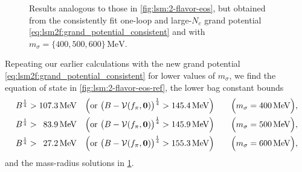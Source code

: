 \begin{figure}[t]
\caption{\label{fig:lsm:2-flavor-mass-radius-ref}%
Results analogous to those in \cref{fig:lsm:2-flavor-eos}, but obtained from the consistently fit one-loop and large-$N_c$ grand potential \eqref{eq:lsm2f:grand_potential_consistent}
and with $m_\sigma = \{400,500,600\} \, \si{\mega\electronvolt}$.
}
\end{figure}

Repeating our earlier calculations with the new grand potential \eqref{eq:lsm2f:grand_potential_consistent} for lower values of $m_\sigma$,
we find the equation of state in \cref{fig:lsm:2-flavor-eos-ref},
the lower bag constant bounds
\begin{subequations}
\begin{align}
	B^\frac14 > \SI{107.3}{\mega\electronvolt}           \quad \Big(\text{or } \big(B-\mathcal{V}(f_\pi,{\bm{0}})\big)^\frac14 > \SI{145.4}{\mega\electronvolt}\Big) \qquad \Big(m_\sigma = \SI{400}{\mega\electronvolt}\Big), \\
	B^\frac14 > \phantom{0}\SI{83.9}{\mega\electronvolt} \quad \Big(\text{or } \big(B-\mathcal{V}(f_\pi,{\bm{0}})\big)^\frac14 > \SI{145.9}{\mega\electronvolt}\Big) \qquad \Big(m_\sigma = \SI{500}{\mega\electronvolt}\Big), \\
	B^\frac14 > \phantom{0}\SI{27.2}{\mega\electronvolt} \quad \Big(\text{or } \big(B-\mathcal{V}(f_\pi,{\bm{0}})\big)^\frac14 > \SI{155.3}{\mega\electronvolt}\Big) \qquad \Big(m_\sigma = \SI{600}{\mega\electronvolt}\Big),
\end{align}%
\label{eq:lsm:bag_lower_bound_ref}%
\end{subequations}
and the mass-radius solutions in \cref{fig:lsm:2-flavor-mass-radius-ref}.

